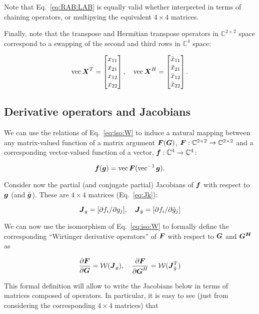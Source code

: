 \documentclass[useAMS,usenatbib]{mn2e}
\makeatletter
\newcommand{\COMPLEX}{\mathbb{C}}
\newcommand{\mat}[1]{{\bmath{#1}}}
\newcommand{\JJ}{\mat{J}} %
\newcommand{\Matrix}[2]{\left [ \begin{array}{@{}#1@{}}#2\end{array} \right ]}
\makeatother
\begin{document}
Note that Eq.~\ref{eq:RAB:LAB} is equally valid whether interpreted in terms of chaining operators, or multipying 
the equivalent $4\times4$ matrices.

Finally, note that the transpose and Hermitian transpose operators in $\COMPLEX^{2\times2}$ space correspond to a swapping
of the second and third rows in $\COMPLEX^4$ space:

\begin{equation}
\label{eq:vec:XH}
\VEC{\mat{X}^T} = \Matrix{c}{x_{11}\\x_{21}\\x_{12}\\x_{22}},~~~
\VEC{\mat{X}^H} = \Matrix{c}{\bar{x}_{11}\\\bar{x}_{21}\\\bar{x}_{12}\\\bar{x}_{22}}.
\end{equation}

\subsection{Derivative operators and Jacobians}

We can use the relations of Eq.~\ref{eq:iso:W} to induce a natural mapping between any matrix-valued function of a 
matrix argument $\mat{F}(\mat{G})$, $\mat{F}:\COMPLEX^{2\times2}\to\COMPLEX^{2\times2}$ and a corresponding 
vector-valued function of a vector, $\bmath{f}:\COMPLEX^4\to\COMPLEX^4$:

\[
\bmath{f}(\bmath{g}) = \VEC{\mat{F}(\VECINV{\bmath{g}})}.
\]

Consider now the partial (and conjugate partial) Jacobians of $\bmath{f}$ with respect to $\bmath{g}$ 
(and $\bar{\bmath{g}}$). These are $4\times4$ matrices (Eq.~\ref{eq:Jk}):

\[
\JJ_g = [ \partial f_i / \partial g_j ],~~~\JJ_{\bar{g}} = [ \partial f_i / \partial \bar{g}_j ]
\]

We can now use the isomorphism of Eq.~\ref{eq:iso:W} to formally define the corresponding ``Wirtinger derivative operators'' 
of $\mat{F}$ with respect to $\mat{G}$ and $\mat{G^H}$ as

\begin{equation}
\label{eq:def:dF:dG}
\frac{\partial\mat{F}}{\partial{\mat{G}}} = \mathcal{W}(\JJ_g),~~~
\frac{\partial\mat{F}}{\partial{\mat{G}^H}} = \mathcal{W}(\JJ_{\bar{g}}^T)
\end{equation}

This formal definition will allow to write the Jacobians below in terms of matrices composed of operators. 
In particular, it is easy to see (just from considering the corresponding $4\times4$ matrices) that
\end{document}
